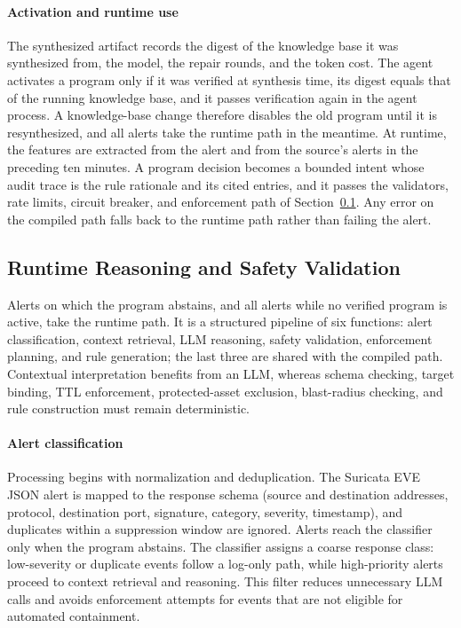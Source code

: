 \documentclass[final,5p]{elsarticle}
\begin{document}
\paragraph{Activation and runtime use}
The synthesized artifact records the digest of the knowledge base it was synthesized from, the model, the repair rounds, and the token cost. The agent activates a program only if it was verified at synthesis time, its digest equals that of the running knowledge base, and it passes verification again in the agent process. A knowledge-base change therefore disables the old program until it is resynthesized, and all alerts take the runtime path in the meantime. At runtime, the features are extracted from the alert and from the source's alerts in the preceding ten minutes. A program decision becomes a bounded intent whose audit trace is the rule rationale and its cited entries, and it passes the validators, rate limits, circuit breaker, and enforcement path of Section~\ref{sec:decision_safety}. Any error on the compiled path falls back to the runtime path rather than failing the alert.

\subsection{Runtime Reasoning and Safety Validation}
\label{sec:decision_safety}

Alerts on which the program abstains, and all alerts while no verified program is active, take the runtime path. It is a structured pipeline of six functions: alert classification, context retrieval, LLM reasoning, safety validation, enforcement planning, and rule generation; the last three are shared with the compiled path. Contextual interpretation benefits from an LLM, whereas schema checking, target binding, TTL enforcement, protected-asset exclusion, blast-radius checking, and rule construction must remain deterministic.

\paragraph{Alert classification}
Processing begins with normalization and deduplication. The Suricata EVE JSON alert is mapped to the response schema (source and destination addresses, protocol, destination port, signature, category, severity, timestamp), and duplicates within a suppression window are ignored. Alerts reach the classifier only when the program abstains. The classifier assigns a coarse response class: low-severity or duplicate events follow a log-only path, while high-priority alerts proceed to context retrieval and reasoning. This filter reduces unnecessary LLM calls and avoids enforcement attempts for events that are not eligible for automated containment.
\end{document}
